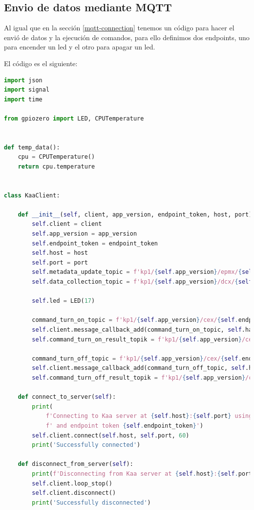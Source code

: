 {\subsection{Envio de datos mediante MQTT}

Al igual que en la sección \ref{mqtt-connection} tenemos un código para hacer el envió de datos y la ejecución de comandos, para ello definimos dos endpoints, uno para encender un led y el otro para apagar un led.


El código es el siguiente:

\begin{lstlisting}[language=Python]
import json
import signal
import time

from gpiozero import LED, CPUTemperature


def temp_data():
    cpu = CPUTemperature()
    return cpu.temperature


class KaaClient:

    def __init__(self, client, app_version, endpoint_token, host, port):
        self.client = client
        self.app_version = app_version
        self.endpoint_token = endpoint_token
        self.host = host
        self.port = port
        self.metadata_update_topic = f'kp1/{self.app_version}/epmx/{self.endpoint_token}/update/keys'
        self.data_collection_topic = f'kp1/{self.app_version}/dcx/{self.endpoint_token}/json'

        self.led = LED(17)

        command_turn_on_topic = f'kp1/{self.app_version}/cex/{self.endpoint_token}/command/turnon/status'
        self.client.message_callback_add(command_turn_on_topic, self.handle_turn_on_command)
        self.command_turn_on_result_topik = f'kp1/{self.app_version}/cex/{self.endpoint_token}/result/turnon'

        command_turn_off_topic = f'kp1/{self.app_version}/cex/{self.endpoint_token}/command/turnoff/status'
        self.client.message_callback_add(command_turn_off_topic, self.handle_turn_off_command)
        self.command_turn_off_result_topik = f'kp1/{self.app_version}/cex/{self.endpoint_token}/result/turnoff'

    def connect_to_server(self):
        print(
            f'Connecting to Kaa server at {self.host}:{self.port} using application version {self.app_version}'
            f' and endpoint token {self.endpoint_token}')
        self.client.connect(self.host, self.port, 60)
        print('Successfully connected')

    def disconnect_from_server(self):
        print(f'Disconnecting from Kaa server at {self.host}:{self.port}...')
        self.client.loop_stop()
        self.client.disconnect()
        print('Successfully disconnected')


\end{lstlisting}}
